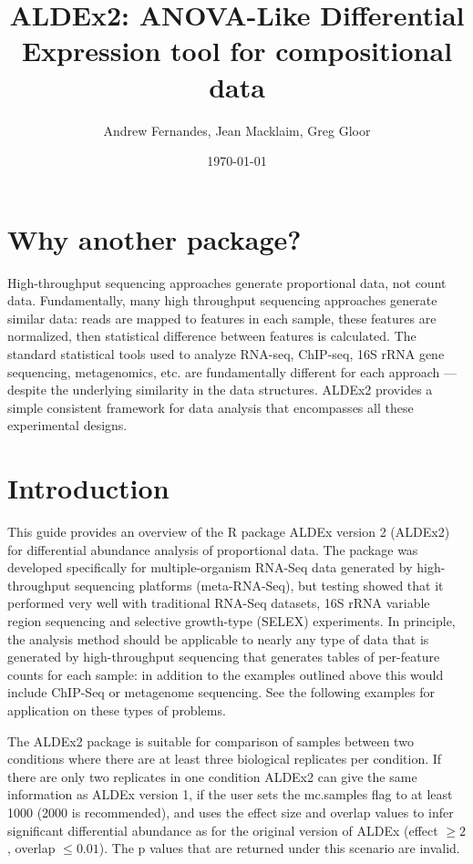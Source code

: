 \documentclass[11pt]{article}
\title{ALDEx2: ANOVA-Like Differential Expression tool for compositional data}
\author{Andrew Fernandes, Jean Macklaim, Greg Gloor}
\date{\today}                                           %
\begin{document}
\maketitle
\tableofcontents
\section{Why another package?}
High-throughput sequencing approaches generate proportional data, not count data. Fundamentally, many high throughput sequencing approaches generate similar data: reads are mapped to features in each sample, these features are normalized, then statistical difference between features is calculated.  The standard statistical tools used to analyze RNA-seq, ChIP-seq, 16S rRNA gene sequencing, metagenomics, etc. are fundamentally different for each approach --- despite the underlying similarity in the data structures. ALDEx2 provides a simple consistent framework for data analysis that encompasses all these experimental designs.
\section{Introduction}
This guide provides an overview of the R package ALDEx version 2 (ALDEx2) for differential abundance analysis of proportional data. The package was developed specifically for multiple-organism RNA-Seq data generated by high-throughput sequencing platforms (meta-RNA-Seq), but testing showed that it performed very well with traditional RNA-Seq datasets, 16S rRNA variable region sequencing and selective growth-type (SELEX) experiments. In principle, the analysis method should be applicable to nearly any type of data that is generated by high-throughput sequencing that generates tables of per-feature counts for each sample: in addition to the examples outlined above this would include  ChIP-Seq or metagenome sequencing. See the following examples for application on these types of problems.

The ALDEx2 package is suitable for comparison of samples between two conditions where there are at least three biological replicates per condition. If there are only two replicates in one condition ALDEx2 can give the same information as ALDEx version 1, if the user sets the mc.samples flag to at least 1000 (2000 is recommended), and uses the effect size and overlap values to infer significant differential abundance as for the original version of ALDEx (effect $\ge 2$, overlap $\le 0.01$). The p values that are returned under this scenario are invalid. %
\end{document}
